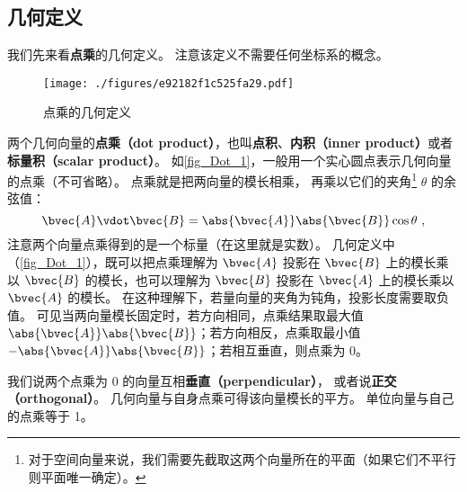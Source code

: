 

\subsection{几何定义}
我们先来看\textbf{点乘}的几何定义。 注意该定义不需要任何坐标系的概念。
\begin{figure}[th]
\centering
\texttt{[image: ./figures/e92182f1c525fa29.pdf]}
\caption{点乘的几何定义}\label{fig_Dot_1}
\end{figure}

两个几何向量的\textbf{点乘（dot product）}，也叫\textbf{点积}、\textbf{内积（inner product）}或者\textbf{标量积（scalar product）}。 如\autoref{fig_Dot_1}，一般用一个实心圆点表示几何向量的点乘（不可省略）。 点乘就是把两向量的模长相乘， 再乘以它们的夹角\footnote{对于空间向量来说，我们需要先截取这两个向量所在的平面（如果它们不平行则平面唯一确定）。} $\theta$ 的余弦值：
\begin{equation}\label{eq_Dot_1}
\bvec{A} \vdot \bvec{B} = \abs{\bvec{A}} \abs{\bvec{B}} \cos\theta ~,
\end{equation}
注意两个向量点乘得到的是一个标量（在这里就是实数）。 几何定义中（\autoref{fig_Dot_1}），既可以把点乘理解为 $\bvec{A}$ 投影在 $\bvec{B}$ 上的模长乘以 $\bvec{B}$ 的模长，也可以理解为 $\bvec{B}$ 投影在 $\bvec{A}$ 上的模长乘以 $\bvec{A}$ 的模长。 在这种理解下，若量向量的夹角为钝角，投影长度需要取负值。 可见当两向量模长固定时，若方向相同，点乘结果取最大值 $\abs{\bvec{A}}\abs{\bvec{B}}$；若方向相反，点乘取最小值 $-\abs{\bvec{A}}\abs{\bvec{B}}$；若相互垂直，则点乘为 0。

我们说两个点乘为 0 的向量互相\textbf{垂直（perpendicular）}， 或者说\textbf{正交（orthogonal）}。 几何向量与自身点乘可得该向量模长的平方。 单位向量与自己的点乘等于 1。 


